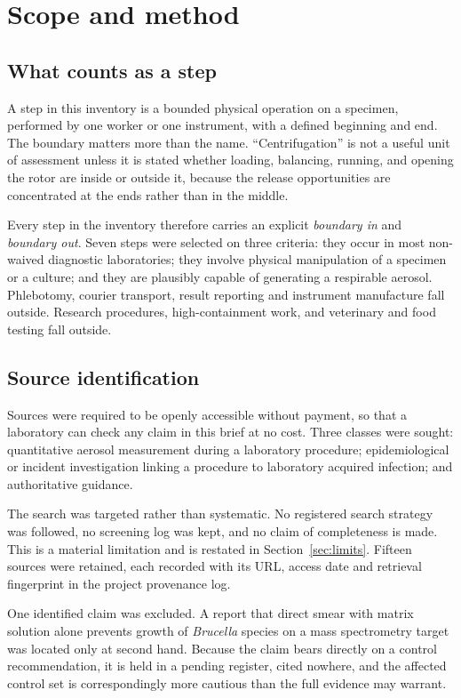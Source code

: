 \section{Scope and method}

\subsection{What counts as a step}

A step in this inventory is a bounded physical operation on a specimen,
performed by one worker or one instrument, with a defined beginning and end.
The boundary matters more than the name. ``Centrifugation'' is not a useful
unit of assessment unless it is stated whether loading, balancing, running, and
opening the rotor are inside or outside it, because the release opportunities
are concentrated at the ends rather than in the middle.

Every step in the inventory therefore carries an explicit \textit{boundary in}
and \textit{boundary out}. Seven steps were selected on three criteria: they
occur in most non-waived diagnostic laboratories; they involve physical
manipulation of a specimen or a culture; and they are plausibly capable of
generating a respirable aerosol. Phlebotomy, courier transport, result
reporting and instrument manufacture fall outside. Research procedures,
high-containment work, and veterinary and food testing fall outside.

\subsection{Source identification}

Sources were required to be openly accessible without payment, so that a
laboratory can check any claim in this brief at no cost. Three classes were
sought: quantitative aerosol measurement during a laboratory procedure;
epidemiological or incident investigation linking a procedure to laboratory
acquired infection; and authoritative guidance.

The search was targeted rather than systematic. No registered search strategy
was followed, no screening log was kept, and no claim of completeness is made.
This is a material limitation and is restated in Section~\ref{sec:limits}.
Fifteen sources were retained, each recorded with its URL, access date and
retrieval fingerprint in the project provenance log.

One identified claim was excluded. A report that direct smear with matrix
solution alone prevents growth of \textit{Brucella} species on a mass
spectrometry target was located only at second hand. Because the claim bears
directly on a control recommendation, it is held in a pending register, cited
nowhere, and the affected control set is correspondingly more cautious than the
full evidence may warrant.

